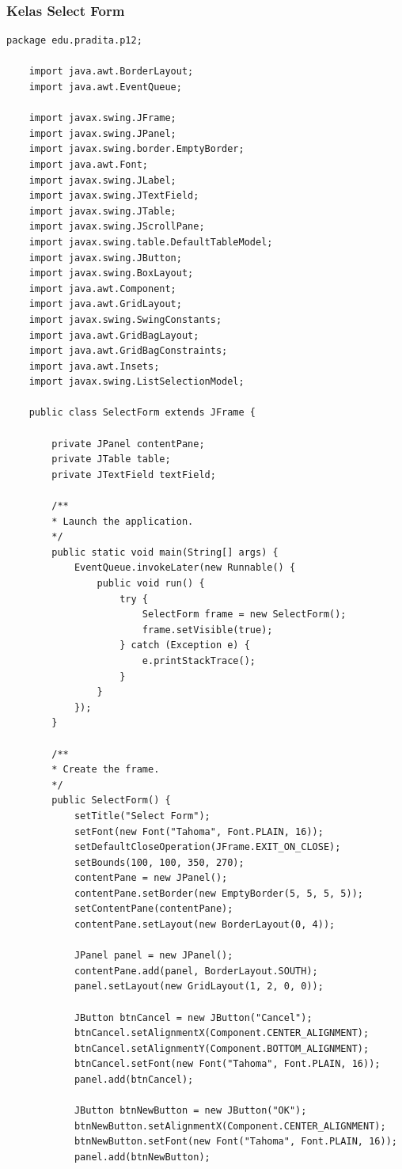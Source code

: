 \subsubsection{Kelas Select Form}

\begin{lstlisting}[style=JavaStyle]
	package edu.pradita.p12;
	
	import java.awt.BorderLayout;
	import java.awt.EventQueue;
	
	import javax.swing.JFrame;
	import javax.swing.JPanel;
	import javax.swing.border.EmptyBorder;
	import java.awt.Font;
	import javax.swing.JLabel;
	import javax.swing.JTextField;
	import javax.swing.JTable;
	import javax.swing.JScrollPane;
	import javax.swing.table.DefaultTableModel;
	import javax.swing.JButton;
	import javax.swing.BoxLayout;
	import java.awt.Component;
	import java.awt.GridLayout;
	import javax.swing.SwingConstants;
	import java.awt.GridBagLayout;
	import java.awt.GridBagConstraints;
	import java.awt.Insets;
	import javax.swing.ListSelectionModel;
	
	public class SelectForm extends JFrame {
		
		private JPanel contentPane;
		private JTable table;
		private JTextField textField;
		
		/**
		* Launch the application.
		*/
		public static void main(String[] args) {
			EventQueue.invokeLater(new Runnable() {
				public void run() {
					try {
						SelectForm frame = new SelectForm();
						frame.setVisible(true);
					} catch (Exception e) {
						e.printStackTrace();
					}
				}
			});
		}
		
		/**
		* Create the frame.
		*/
		public SelectForm() {
			setTitle("Select Form");
			setFont(new Font("Tahoma", Font.PLAIN, 16));
			setDefaultCloseOperation(JFrame.EXIT_ON_CLOSE);
			setBounds(100, 100, 350, 270);
			contentPane = new JPanel();
			contentPane.setBorder(new EmptyBorder(5, 5, 5, 5));
			setContentPane(contentPane);
			contentPane.setLayout(new BorderLayout(0, 4));
			
			JPanel panel = new JPanel();
			contentPane.add(panel, BorderLayout.SOUTH);
			panel.setLayout(new GridLayout(1, 2, 0, 0));
			
			JButton btnCancel = new JButton("Cancel");
			btnCancel.setAlignmentX(Component.CENTER_ALIGNMENT);
			btnCancel.setAlignmentY(Component.BOTTOM_ALIGNMENT);
			btnCancel.setFont(new Font("Tahoma", Font.PLAIN, 16));
			panel.add(btnCancel);
			
			JButton btnNewButton = new JButton("OK");
			btnNewButton.setAlignmentX(Component.CENTER_ALIGNMENT);
			btnNewButton.setFont(new Font("Tahoma", Font.PLAIN, 16));
			panel.add(btnNewButton);
			

\end{lstlisting}
